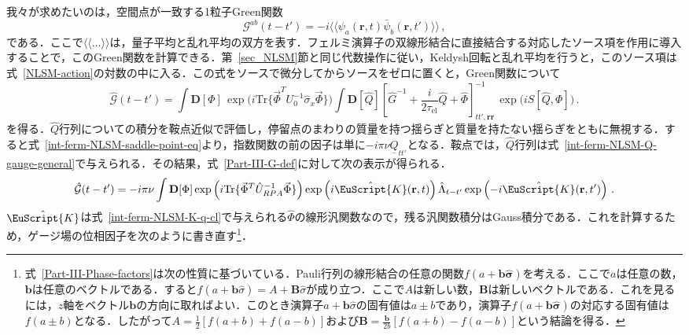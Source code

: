 \documentclass[a4paper,11pt]{ltjsarticle}
\def\Tr{\mathrm{Tr}}
\def\D{\mathbf{D}}
\def\rt{(\mathbf{r},t)}
\def\tauel{\tau_{\mathrm{el}}}
\begin{document}
我々が求めたいのは，空間点が一致する1粒子Green関数
\begin{equation}
\mathcal{G}^{ab}(t-t')=-i\big\langle\big\langle\psi_{a}\rt
\bar{\psi}_{b}(\mathbf{r},t')\big\rangle\big\rangle\,,
\end{equation}
である．ここで$\langle\langle\ldots\rangle\rangle$は，量子平均と乱れ平均の双方を表す．フェルミ演算子の双線形結合に直接結合する対応したソース項を作用に導入することで，このGreen関数を計算できる．第~\ref{sec_NLSM}節と同じ代数操作に従い，Keldysh回転と乱れ平均を行うと，このソース項は式~\eqref{NLSM-action}の対数の中に入る．この式をソースで微分してからソースをゼロに置くと，Green関数について
\begin{equation}\label{Part-III-G-def}
\hat{\mathcal{G}}(t-t') = \int\!\! \D[\Phi]\,
\exp\big(i\Tr\{\vec{\Phi}^{T}U^{-1}_{0}\hat{\sigma}_{x}\vec{\Phi}\}\big)
\int\D[\hat Q]
\left[\hat{G}^{-1}+\frac{i}{2\tauel}\hat{Q}+
\hat{\Phi}\right]^{-1}_{tt',\mathbf{r}\mathbf{r}}\, \exp\big(iS[\hat Q,\Phi]\big)\,.
\end{equation}
を得る．$\hat Q$行列についての積分を鞍点近似で評価し，停留点のまわりの質量を持つ揺らぎと質量を持たない揺らぎをともに無視する．すると式~\eqref{int-ferm-NLSM-saddle-point-eq}より，指数関数の前の因子は単に$-i\pi\nu\underline{\hat{Q}}_{tt'}$となる．鞍点では，$\hat Q$行列は式~\eqref{int-ferm-NLSM-Q-gauge-general}で与えられる．その結果，式~\eqref{Part-III-G-def}に対して次の表示が得られる．
\begin{equation}\label{Part-III-G}
\hat{\mathcal{G}}(t-t')=-i\pi\nu\int\D[\Phi]
\exp\left(i\Tr\{\vec{\Phi}^{T}\hat{U}^{-1}_{RPA}\vec{\Phi}\}\right)
\exp\left(i\hat{\EuScript{K}}\rt\right)\hat{\Lambda}_{t-t'}
\exp\left(-i\hat{\EuScript{K}}(\mathbf{r},t')\right)\,.
\end{equation}
$\hat{\EuScript{K}}$は式~\eqref{int-ferm-NLSM-K-q-cl}で与えられる$\hat{\Phi}$の線形汎関数なので，残る汎関数積分はGauss積分である．これを計算するため，ゲージ場の位相因子を次のように書き直す\footnote{式~\eqref{Part-III-Phase-factors}は次の性質に基づいている．Pauli行列の線形結合の任意の関数$f(a+\mathbf{b\hat{\sigma}})$を考える．ここで$a$は任意の数，$\mathbf{b}$は任意のベクトルである．すると$f(a+\mathbf{b}\hat{\sigma})=A+\mathbf{B}\hat{\sigma}$が成り立つ．ここで$A$は新しい数，$\mathbf{B}$は新しいベクトルである．これを見るには，$z$軸をベクトル$\mathbf{b}$の方向に取ればよい．このとき演算子$a+\mathbf{b}\hat{\sigma}$の固有値は$a\pm b$であり，演算子$f(a+\mathbf{b\hat{\sigma}})$の対応する固有値は$f(a\pm b)$となる．したがって$A=\frac{1}{2}[f(a+b)+f(a-b)]$および$\mathbf{B}=\frac{\mathbf{b}}{2b}[f(a+b)-f(a-b)]$という結論を得る．}．
\end{document}
